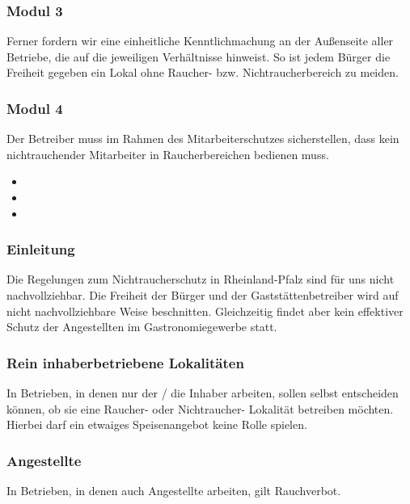 \subsubsection{Modul 3}
\abstimmung
Ferner fordern wir eine einheitliche Kenntlichmachung an der Außenseite aller Betriebe, die auf die jeweiligen Verhältnisse hinweist. So ist jedem Bürger die Freiheit gegeben ein Lokal ohne Raucher- bzw. Nichtraucherbereich zu meiden.

\subsubsection{Modul 4}
\abstimmung
Der Betreiber muss im Rahmen des Mitarbeiterschutzes sicherstellen, dass kein nichtrauchender Mitarbeiter in Raucherbereichen bedienen muss.
 
\label{wp:selbst:raucher4}
\begin{itemize}
\item {}
\item {}
\item {}
\end{itemize}

\subsubsection{Einleitung}
\abstimmung
Die Regelungen zum Nichtraucherschutz in Rheinland-Pfalz sind für uns nicht nachvollziehbar. Die Freiheit der Bürger und der Gaststättenbetreiber wird auf nicht nachvollziehbare Weise beschnitten. Gleichzeitig findet aber kein effektiver Schutz der Angestellten im Gastronomiegewerbe statt.

\subsubsection{Rein inhaberbetriebene Lokalitäten}
\abstimmung
In Betrieben, in denen nur der / die Inhaber arbeiten, sollen selbst entscheiden können, ob sie eine Raucher- oder Nichtraucher- Lokalität betreiben möchten. Hierbei darf ein etwaiges Speisenangebot keine Rolle spielen.

\subsubsection{Angestellte}
\abstimmung
In Betrieben, in denen auch Angestellte arbeiten, gilt Rauchverbot.

